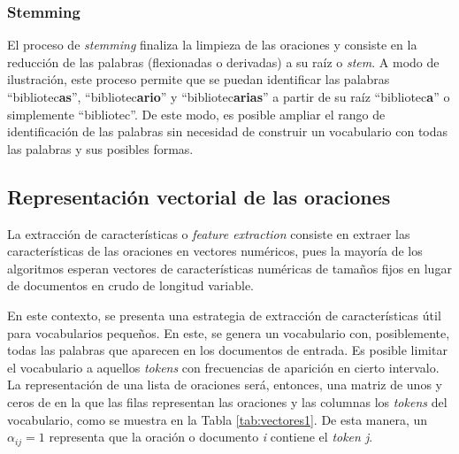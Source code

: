 \documentclass[conference]{IEEEtran}
\begin{document}
    	\subsubsection{Stemming}
    
    		El proceso de \textit{stemming} finaliza la limpieza de las oraciones y consiste en la reducción de las palabras (flexionadas o derivadas) a su raíz o \textit{stem}. A modo de ilustración, este proceso permite que se puedan identificar las palabras ``bibliotec\textbf{as}'', ``bibliotec\textbf{ario}'' y ``bibliotec\textbf{arias}'' a partir de su raíz ``bibliotec\textbf{a}'' o simplemente ``bibliotec''. De este modo, es posible ampliar el rango de identificación de las palabras sin necesidad de construir un vocabulario con todas las palabras y sus posibles formas. 
    		    
    
    
    
    \subsection{Representación vectorial de las oraciones}
    
        La extracción de características o \textit{feature extraction} consiste en extraer las características de las oraciones en vectores numéricos, pues la mayoría de los algoritmos esperan vectores de características numéricas de tamaños fijos en lugar de documentos en crudo de longitud variable.
        
        En este contexto, se presenta una estrategia de extracción de características útil para vocabularios pequeños. En este, se genera un vocabulario con, posiblemente, todas las palabras que aparecen en los documentos de entrada. Es posible limitar el vocabulario a aquellos \textit{tokens} con frecuencias de aparición en cierto intervalo. La representación de una lista de oraciones será, entonces, una matriz de unos y ceros de en la que las filas representan las oraciones y las columnas los \textit{tokens} del vocabulario, como se muestra en la Tabla \ref{tab:vectores1}. De esta manera, un $\alpha_{ij} = 1$ representa que la oración o documento \textit{i} contiene el \textit{token j}.
        
\end{document}
